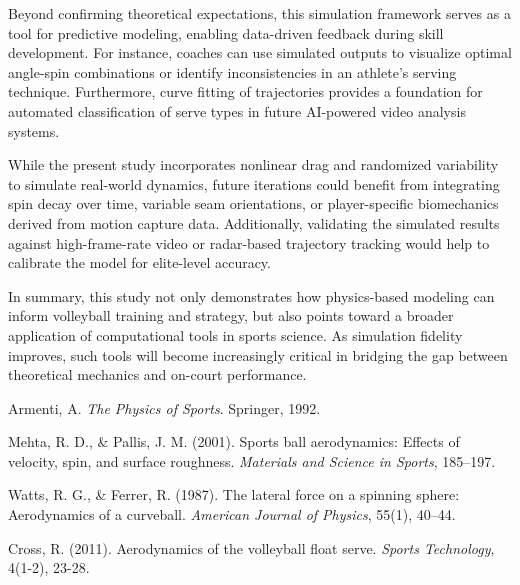 \documentclass[11pt]{article}
\begin{document}
Beyond confirming theoretical expectations, this simulation framework serves as a tool for predictive modeling, enabling data-driven feedback during skill development. For instance, coaches can use simulated outputs to visualize optimal angle-spin combinations or identify inconsistencies in an athlete’s serving technique. Furthermore, curve fitting of trajectories provides a foundation for automated classification of serve types in future AI-powered video analysis systems.

While the present study incorporates nonlinear drag and randomized variability to simulate real-world dynamics, future iterations could benefit from integrating spin decay over time, variable seam orientations, or player-specific biomechanics derived from motion capture data. Additionally, validating the simulated results against high-frame-rate video or radar-based trajectory tracking would help to calibrate the model for elite-level accuracy.

In summary, this study not only demonstrates how physics-based modeling can inform volleyball training and strategy, but also points toward a broader application of computational tools in sports science. As simulation fidelity improves, such tools will become increasingly critical in bridging the gap between theoretical mechanics and on-court performance.

\begin{thebibliography}{9}

Armenti, A. \textit{The Physics of Sports}. Springer, 1992.

Mehta, R. D., \& Pallis, J. M. (2001). Sports ball aerodynamics: Effects of velocity, spin, and surface roughness. \textit{Materials and Science in Sports}, 185–197.

Watts, R. G., \& Ferrer, R. (1987). The lateral force on a spinning sphere: Aerodynamics of a curveball. \textit{American Journal of Physics}, 55(1), 40–44.

Cross, R. (2011). Aerodynamics of the volleyball float serve. \textit{Sports Technology}, 4(1-2), 23-28.

\end{thebibliography}
\end{document}
